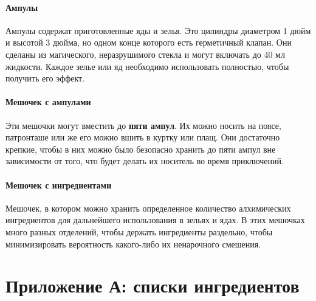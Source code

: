 \documentclass[a4paper, 9pt, twocolumn]{book}
\begin{document}
	\subsubsection{Ампулы}
	
	Ампулы содержат приготовленные яды и зелья. Это цилиндры диаметром 1 дюйм и высотой 3 дюйма, но одном конце которого есть герметичный клапан. Они сделаны из магического, неразрушимого стекла и могут включать до 40 мл жидкости. Каждое зелье или яд необходимо использовать полностью, чтобы получить его эффект.
	
	\subsubsection{Мешочек с ампулами}
	
	Эти мешочки могут вместить до \textbf{пяти ампул}. Их можно носить на поясе, патронташе или же его можно вшить в куртку или плащ. Они достаточно крепкие, чтобы в них можно было безопасно хранить до пяти ампул вне зависимости от того, что будет делать их носитель во время приключений.
	
	\subsubsection{Мешочек с ингредиентами}
	
	Мешочек, в котором можно хранить определенное количество алхимических ингредиентов для дальнейшего использования в зельях и ядах. В этих мешочках много разных отделений, чтобы держать ингредиенты раздельно, чтобы минимизировать вероятность какого-либо их ненарочного смешения.
	
	\onecolumn

	\chapter{Приложение А: списки ингредиентов}
	
\end{document}
